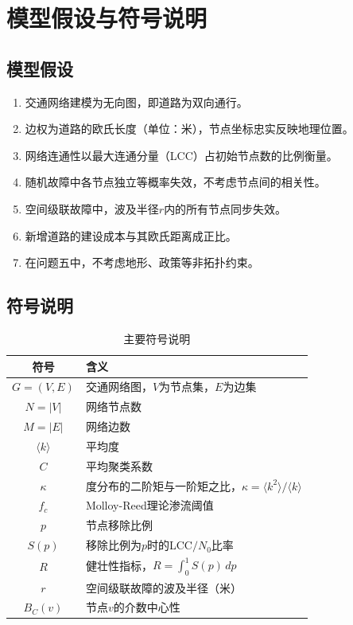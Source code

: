 \documentclass[12pt,a4paper]{article}
\begin{document}
\section{模型假设与符号说明}

\subsection{模型假设}

\begin{enumerate}[label=\textbf{假设\arabic*：}, leftmargin=4em]
    \item 交通网络建模为无向图，即道路为双向通行。
    \item 边权为道路的欧氏长度（单位：米），节点坐标忠实反映地理位置。
    \item 网络连通性以最大连通分量（LCC）占初始节点数的比例衡量。
    \item 随机故障中各节点独立等概率失效，不考虑节点间的相关性。
    \item 空间级联故障中，波及半径$r$内的所有节点同步失效。
    \item 新增道路的建设成本与其欧氏距离成正比。
    \item 在问题五中，不考虑地形、政策等非拓扑约束。
\end{enumerate}

\subsection{符号说明}

\begin{table}[H]
\centering
\caption{主要符号说明}
\begin{tabular}{cl}
\toprule
\textbf{符号} & \textbf{含义} \\
\midrule
$G=(V,E)$ & 交通网络图，$V$为节点集，$E$为边集 \\
$N=|V|$ & 网络节点数 \\
$M=|E|$ & 网络边数 \\
$\langle k \rangle$ & 平均度 \\
$C$ & 平均聚类系数 \\
$\kappa$ & 度分布的二阶矩与一阶矩之比，$\kappa = \langle k^2 \rangle / \langle k \rangle$ \\
$f_c$ & Molloy-Reed理论渗流阈值 \\
$p$ & 节点移除比例 \\
$S(p)$ & 移除比例为$p$时的LCC$/N_0$比率 \\
$R$ & 健壮性指标，$R = \int_0^1 S(p)\,dp$ \\
$r$ & 空间级联故障的波及半径（米） \\
$B_C(v)$ & 节点$v$的介数中心性 \\
\bottomrule
\end{tabular}
\end{table}
\end{document}
